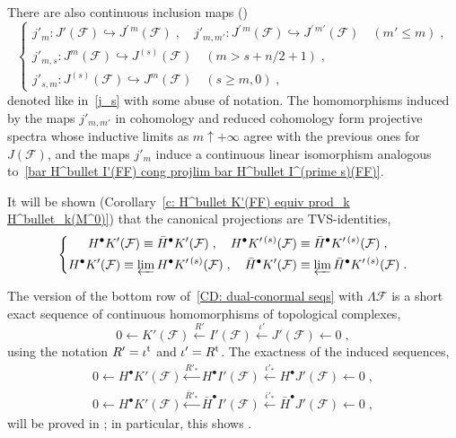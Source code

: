 \documentclass{memo-l}
\theoremstyle{plain}
\theoremstyle{definition}
\theoremstyle{remark}
\newcommand{\FF}{\mathcal{F}}
\newcommand{\trans}{{\text{\rm t}}}
\numberwithin{section}{chapter}
\numberwithin{equation}{section}%
\begin{document}
There are also continuous inclusion maps ()
\begin{equation}\label{j_m}
\left\{
\begin{gathered}
j'_m:J'(\FF)\hookrightarrow J^{\prime\,m}(\FF)\;,\quad 
j'_{m,m'}:J^{\prime\,m}(\FF)\hookrightarrow J^{\prime\,m'}(\FF)\quad(m'\le m)\;,\\
j'_{m,s}:J^m(\FF)\hookrightarrow J^{(s)}(\FF)\quad(m>s+n/2+1)\;,\\
j'_{s,m}:J^{(s)}(\FF)\hookrightarrow J^m(\FF)\quad(s\ge m,0)\;, 
\end{gathered}
\right.
\end{equation}
denoted like in~\eqref{j_s} with some abuse of notation. The homomorphisms induced by the maps $j'_{m,m'}$ in cohomology and reduced cohomology form projective spectra whose inductive limits as $m\uparrow+\infty$ agree with the previous ones for $J(\FF)$, and the maps $j'_m$ induce a continuous linear isomorphism analogous to~\eqref{bar H^bullet I'(FF) cong projlim bar H^bullet I^(prime s)(FF)}.

It will be shown (Corollary~\ref{c: H^bullet K'(FF) equiv prod_k H^bullet_k(M^0)}) that the canonical projections are TVS-identities, 
\begin{equation}\label{H^bullet K'(FF) equiv bar H^bullet K'(FF)}
\left\{
\begin{gathered}
H^\bullet K'(\FF)\equiv\bar H^\bullet K'(\FF)\;,\quad 
H^\bullet K^{\prime\,(s)}(\FF)\equiv\bar H^\bullet K^{\prime\,(s)}(\FF)\;,\\
H^\bullet K'(\FF)\equiv\varprojlim H^\bullet K^{\prime\,(s)}(\FF)\;,\quad\bar H^\bullet K'(\FF)\equiv\varprojlim\bar H^\bullet K^{\prime\,(s)}(\FF)\;.
\end{gathered}
\right.
\end{equation}

The version of the bottom row of~\eqref{CD: dual-conormal seqs} with $\Lambda\FF$  is a short exact sequence of continuous homomorphisms of topological complexes,
\begin{equation}\label{leafwise dual-conormal exact seq}
0\leftarrow K'(\FF) \xleftarrow{R'} I'(\FF) \xleftarrow{\iota'} J'(\FF)\leftarrow0\;,
\end{equation}
using the notation $R'=\iota^\trans$  and $\iota'=R^\trans$.  The exactness of the induced sequences,
\begin{gather}
0\leftarrow H^\bullet K'(\FF) \xleftarrow{R'_*} H^\bullet I'(\FF) \xleftarrow{\iota'_*} H^\bullet J'(\FF)\leftarrow0\;,
\label{exact seq in cohom - dual-conormal}\\
0\leftarrow H^\bullet K'(\FF) \xleftarrow{\bar R'_*} \bar H^\bullet I'(\FF) \xleftarrow{\bar\iota'_*} \bar H^\bullet J'(\FF)\leftarrow0\;,
\label{exact seq in reduced cohom - dual-conormal}
\end{gather}
will be proved in ; in particular, this shows .
\end{document}
